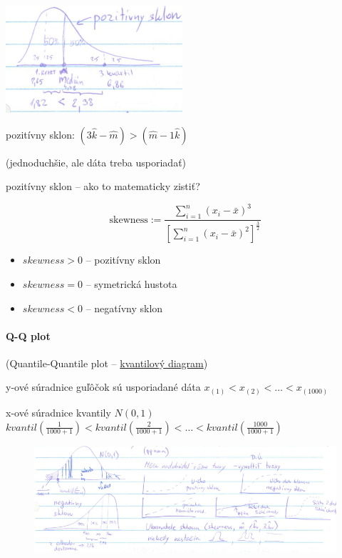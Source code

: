 \documentclass[unknownkeysallowed]{article}
\begin{document}
\begin{multicols}{2}
\includegraphics[width=0.7\linewidth]{imgs/obr11.png}

pozitívny sklon: $(3\hat{k}-\hat{m}) > (\hat{m}-1\hat{k})$


(jednoduchšie, ale dáta treba usporiadať)
\columnbreak

{pozitívny sklon -- ako to matematicky zistiť?}

\begin{equation*}
\mathrm{skewness} := \dfrac{\sum\limits_{i=1}^{n}{(x_i-\bar{x})^3}}{\left[\sum\limits_{i=1}^{n}{(x_i-\bar{x})^2}\right]^{\frac{3}{2}}}
\end{equation*}

\begin{itemize}
\item $skewness>0$ -- pozitívny sklon
\item $skewness=0$ -- symetrická hustota
\item $skewness<0$ -- negatívny sklon
\end{itemize}
\end{multicols}

\paragraph{Q-Q plot} (Quantile-Quantile plot -- \underline{kvantilový diagram})

y-ové súradnice guľôčok sú usporiadané dáta $x_{(1)} < x_{(2)} < \ldots < x_{(1000)}$

x-ové súradnice kvantily $N(0,1)$ \qquad $kvantil(\frac{1}{1000+1}) < kvantil(\frac{2}{1000+1}) < \ldots < kvantil(\frac{1000}{1000+1})$

\begin{figure}[ht]
\includegraphics[width=\textwidth]{imgs/obr12.png}
\centering
\end{figure}
\end{document}
